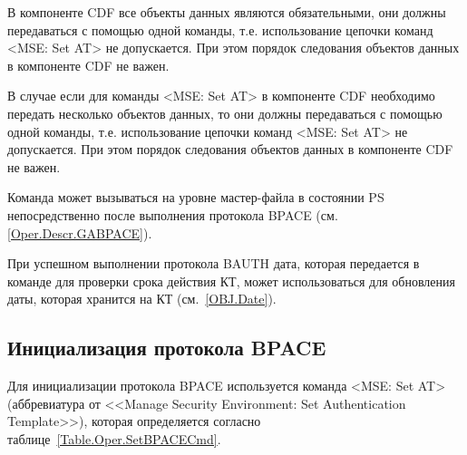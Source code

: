 В компоненте CDF все объекты данных являются обязательными, 
они должны передаваться с помощью одной команды, 
т.е. использование цепочки команд <MSE: Set AT> не допускается. 
При этом порядок следования объектов данных в компоненте CDF не важен. 

В случае если для команды <MSE: Set AT> в компоненте CDF необходимо 
передать несколько объектов данных, то они должны передаваться с помощью 
одной команды, т.е. использование цепочки команд <MSE: Set AT> не 
допускается. При этом порядок следования объектов данных в компоненте CDF 
не важен. 
\fi

Команда может вызываться на уровне мастер-файла в состоянии PS 
непосредственно после выполнения протокола BPACE (см. \ref{Oper.Descr.GABPACE}).


При успешном выполнении протокола BAUTH дата, которая передается в команде 
для проверки срока действия КТ, может использоваться для обновления даты, 
которая хранится на КТ (см.~\ref{OBJ.Date}). 


\subsection{Инициализация протокола BPACE}
\label{Oper.Descr.SetBPACE}

Для инициализации протокола BPACE используется команда
<MSE: Set AT> (аббревиатура от <<Manage Security Environment: Set 
Authentication Template>>), 
которая определяется согласно 
таблице~\ref{Table.Oper.SetBPACECmd}.

